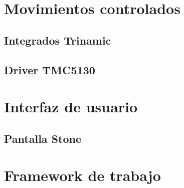 \section{Movimientos controlados}
\subsection{Integrados Trinamic}
\subsection{Driver TMC5130}

\section{Interfaz de usuario}
\subsection{Pantalla Stone}

\section{Framework de trabajo}

